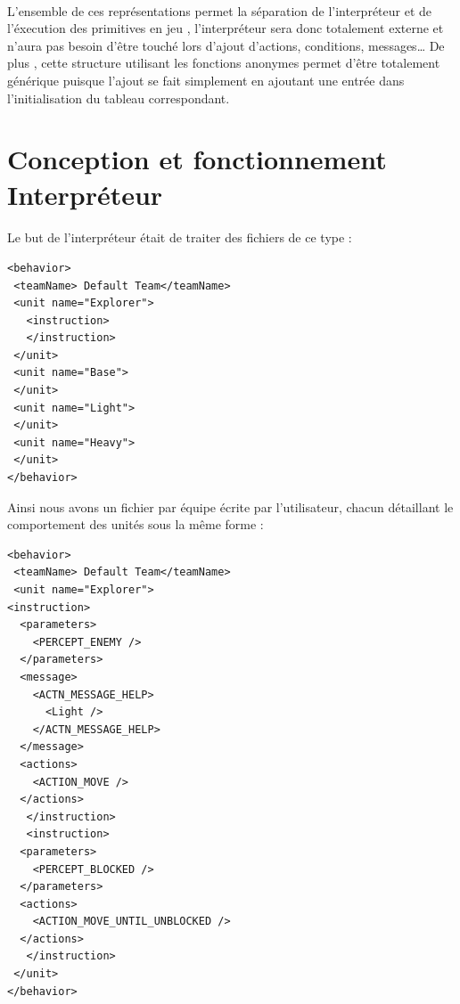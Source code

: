 \documentclass{report}
\begin{document}
\paragraph{}

L’ensemble de ces représentations permet la séparation de l’interpréteur et de l’éxecution des primitives en jeu , l’interpréteur sera donc totalement externe et n’aura pas besoin d’être touché lors d’ajout d’actions, conditions, messages…
De plus , cette structure utilisant les fonctions anonymes permet d'être totalement générique puisque l’ajout se fait simplement en ajoutant une entrée dans l’initialisation du tableau correspondant.
\paragraph{}



\paragraph{}
\newpage

\section{Conception et fonctionnement Interpréteur}
\paragraph{}


Le but de l'interpréteur était de traiter des fichiers de ce type :
\begin{lstlisting}[frame=single]
<behavior>
 <teamName> Default Team</teamName>
 <unit name="Explorer">
   <instruction>
   </instruction>
 </unit>
 <unit name="Base">
 </unit>
 <unit name="Light">
 </unit>
 <unit name="Heavy">
 </unit>
</behavior>
\end{lstlisting}

Ainsi nous avons un fichier par équipe écrite par l'utilisateur, chacun détaillant le comportement des unités sous la même forme :

\begin{lstlisting}[frame=single]
<behavior>
 <teamName> Default Team</teamName>
 <unit name="Explorer">
<instruction>
  <parameters>
    <PERCEPT_ENEMY />
  </parameters>
  <message>
    <ACTN_MESSAGE_HELP>
      <Light />
    </ACTN_MESSAGE_HELP>
  </message>
  <actions>
    <ACTION_MOVE />
  </actions>
   </instruction>
   <instruction>
  <parameters>
    <PERCEPT_BLOCKED />
  </parameters>
  <actions>
    <ACTION_MOVE_UNTIL_UNBLOCKED />
  </actions>
   </instruction>
 </unit>
</behavior>
\end{lstlisting}
\end{document}
